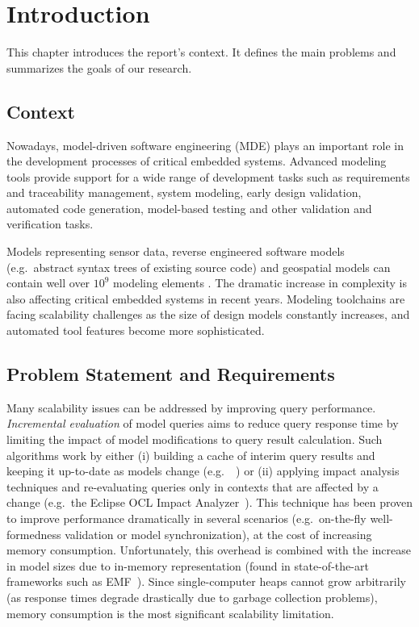 \chapter{Introduction}
\label{chap:introduction}

This chapter introduces the report's context. It defines the main problems and summarizes the goals of our research.  

\section{Context}

Nowadays, model-driven software engineering (MDE) plays an important role in the development processes of critical embedded systems. Advanced modeling tools provide support for a wide range of development tasks such as requirements and traceability management, system modeling, early design validation, automated code generation, model-based testing and other validation and verification tasks. 

Models representing sensor data, reverse engineered software models (e.g.\ abstract syntax trees of existing source code) and geospatial models can contain well over $10^9$ modeling elements \cite{Scheidgen12}. The dramatic increase in complexity is also affecting critical embedded systems in recent years. Modeling toolchains are facing scalability challenges as the size of design models constantly increases, and automated tool features become more sophisticated.

\section{Problem Statement and Requirements}

Many scalability issues can be addressed by improving query performance. \emph{Incremental evaluation} of model queries aims to reduce query response time by limiting the impact of model modifications to query result calculation. Such algorithms work by either (i) building a cache of interim query results and keeping it up-to-date as models change (e.g.\ \eiq{}~\cite{models10}) or (ii) applying impact analysis techniques and re-evaluating queries only in contexts that are affected by a change (e.g.\ the Eclipse OCL Impact Analyzer~\cite{OCLIA}). This technique has been proven to improve performance dramatically in several scenarios (e.g.\ on-the-fly well-formedness validation or model synchronization), at the cost of increasing memory consumption. Unfortunately, this overhead is combined with the increase in model sizes due to in-memory representation (found in state-of-the-art frameworks such as EMF~\cite{EMF}). Since single-computer heaps cannot grow arbitrarily (as response times degrade drastically due to garbage collection problems), memory consumption is the most significant scalability limitation.%

